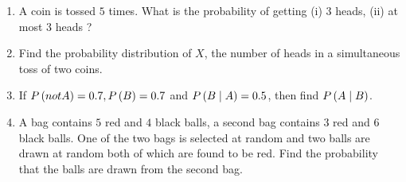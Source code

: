 \begin{enumerate}

\item A coin is tossed $5$ times. What is the probability of getting (i) $3$ heads,
 (ii) at most $3$ heads ?
\item Find the probability distribution of $X$, the number of heads in a simultaneous toss of two coins.
\item If $P\left(not A\right) =0.7, P\left(B\right)=0.7$ and $P\left(B\mid A\right)=0.5$, then find $P\left(A\mid B\right)$.
\item A bag contains $5$ red and $4$ black balls, a second bag contains $3$ red and $6$ black balls. One of the two bags is selected at random and two balls are drawn at random  both of which are found to be red. Find the probability that the balls are drawn from the second bag.      
\end{enumerate}
